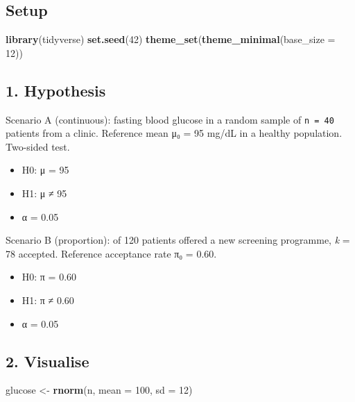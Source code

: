 \documentclass[
]{article}
\newenvironment{Shaded}{\begin{snugshade}}{\end{snugshade}}
\newcommand{\AttributeTok}[1]{\textcolor[rgb]{0.13,0.29,0.53}{#1}}
\newcommand{\DecValTok}[1]{\textcolor[rgb]{0.00,0.00,0.81}{#1}}
\newcommand{\FunctionTok}[1]{\textcolor[rgb]{0.13,0.29,0.53}{\textbf{#1}}}
\newcommand{\NormalTok}[1]{#1}
\newcommand{\OtherTok}[1]{\textcolor[rgb]{0.56,0.35,0.01}{#1}}
\providecommand{\tightlist}{%
  \setlength{\itemsep}{0pt}\setlength{\parskip}{0pt}}
\begin{document}
\subsection{Setup}\label{setup}

\begin{Shaded}
\begin{Highlighting}[]
\FunctionTok{library}\NormalTok{(tidyverse)}
\FunctionTok{set.seed}\NormalTok{(}\DecValTok{42}\NormalTok{)}
\FunctionTok{theme\_set}\NormalTok{(}\FunctionTok{theme\_minimal}\NormalTok{(}\AttributeTok{base\_size =} \DecValTok{12}\NormalTok{))}
\end{Highlighting}
\end{Shaded}

\subsection{1. Hypothesis}\label{hypothesis}

Scenario A (continuous): fasting blood glucose in a random sample of
\texttt{n\ =\ 40} patients from a clinic. Reference mean μ₀ = 95 mg/dL
in a healthy population. Two-sided test.

\begin{itemize}
\tightlist
\item
  H0: μ = 95
\item
  H1: μ ≠ 95
\item
  α = 0.05
\end{itemize}

Scenario B (proportion): of 120 patients offered a new screening
programme, \emph{k} = 78 accepted. Reference acceptance rate π₀ = 0.60.

\begin{itemize}
\tightlist
\item
  H0: π = 0.60
\item
  H1: π ≠ 0.60
\item
  α = 0.05
\end{itemize}

\subsection{2. Visualise}\label{visualise}

\begin{Shaded}
\begin{Highlighting}[]
\NormalTok{glucose }\OtherTok{\textless{}{-}} \FunctionTok{rnorm}\NormalTok{(n, }\AttributeTok{mean =} \DecValTok{100}\NormalTok{, }\AttributeTok{sd =} \DecValTok{12}\NormalTok{)}
\end{Highlighting}
\end{Shaded}
\end{document}
